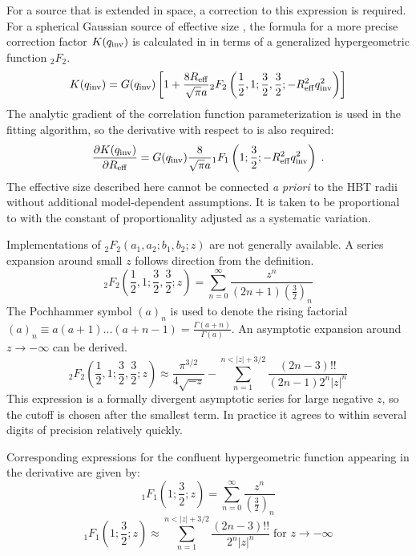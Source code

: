 For a source that is extended in space, a correction to this expression is required.
For a spherical Gaussian source of effective size \Reff, the formula for a more precise correction factor $K(q_{\mathrm{inv}})$ is calculated in  in terms of a generalized hypergeometric function ${}_2 F_2$.
\begin{equation} K(q_{\mathrm{inv}}) = G(q_{\mathrm{inv}}) \left[ 1 + \frac{8R_{\mathrm{eff}}}{\sqrt{\pi}a} {}_2 F_2 \left( \frac{1}{2}, 1; \frac{3}{2}, \frac{3}{2}; -R_{\mathrm{eff}}^2 q_{\mathrm{inv}}^2 \right) \right] \end{equation}
The analytic gradient of the correlation function parameterization is used in the fitting algorithm, so the derivative with respect to \Reff is also required:
\begin{equation}
  \frac{\partial K(q_{\mathrm{inv}})}{\partial R_{\mathrm{eff}}} = G(q_{\mathrm{inv}}) \frac{8}{\sqrt{\pi}a} {}_1 F_1 \left( 1; \frac{3}{2}; -R_{\mathrm{eff}}^2 q_{\mathrm{inv}}^2 \right) \; .
\end{equation}
The effective size \Reff described here cannot be connected \emph{a priori} to the HBT radii without additional model-dependent assumptions.
It is taken to be proportional to \Rinv with the constant of proportionality adjusted as a systematic variation.

Implementations of ${}_2F_2 (a_1, a_2; b_1, b_2; z)$ are not generally available.
A series expansion around small $z$ follows direction from the definition.
\begin{equation} {}_2F_2 \left( \frac{1}{2}, 1; \frac{3}{2}, \frac{3}{2}; z \right) = \sum_{n=0}^{\infty} \frac{z^n}{(2n+1) \left(\frac{3}{2}\right)_n} \end{equation}
The Pochhammer symbol $(a)_n$ is used to denote the rising factorial $(a)_n \equiv a(a+1)...(a+n-1) = \frac{\Gamma(a+n)}{\Gamma(a)}$.
An asymptotic expansion around $z \to - \infty$ can be derived.
\begin{equation} {}_2F_2 \left( \frac{1}{2}, 1; \frac{3}{2}, \frac{3}{2}; z \right) \approx \frac{\pi^{3/2}}{4\sqrt{-z}} - \sum_{n=1}^{n < |z| + 3/2} \frac{(2n-3)!!}{(2n-1) 2^n |z|^n}  \end{equation}
This expression is a formally divergent asymptotic series for large negative $z$, so the cutoff is chosen after the smallest term.
In practice it agrees to within several digits of precision relatively quickly.

Corresponding expressions for the confluent hypergeometric function appearing in the derivative are given by:
\begin{equation}
 {}_1F_1 \left( 1;\frac{3}{2}; z \right) = \sum_{n=0}^{\infty} \frac{z^n}{\left(\frac{3}{2}\right)_n} 
\end{equation}
\begin{equation}
  {}_1F_1 \left( 1; \frac{3}{2}; z \right) \approx \sum_{n=1}^{n < |z| + 3/2} \frac{(2n-3)!!}{2^n |z|^n} \; \textrm{for } z \rightarrow -\infty
\end{equation}

